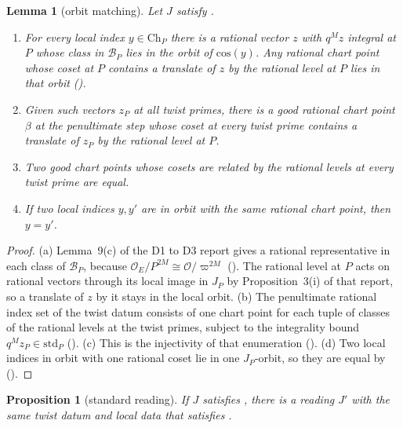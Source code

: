 \documentclass[11pt]{article}
\newcommand{\OEr}{\mathcal O_E}
\newcommand{\Ok}{\mathcal O}
\newcommand{\Bx}{\mathcal B}
\newtheorem{proposition}[theorem]{Proposition}
\newtheorem{lemma}[theorem]{Lemma}
\theoremstyle{remark}
\begin{document}
\begin{lemma}[orbit matching]\label{lem:orb}
Let $J$ satisfy .
\begin{enumerate}[label=(\alph*),itemsep=1pt]
\item For every local index $y\in\mathrm{Ch}_P$ there is a rational vector $z$ with $q^{M}z$ integral at $P$ whose class in $\Bx_P$ lies in the orbit of $\mathrm{cos}(y)$. Any rational chart point whose coset at $P$ contains a translate of $z$ by the rational level at $P$ lies in that orbit ().
\item Given such vectors $z_P$ at all twist primes, there is a good rational chart point $\beta$ at the penultimate step whose coset at every twist prime contains a translate of $z_P$ by the rational level at $P$.
\item Two good chart points whose cosets are related by the rational levels at every twist prime are equal.
\item If two local indices $y,y'$ are in orbit with the same rational chart point, then $y=y'$.
\end{enumerate}
\end{lemma}

\begin{proof}
(a) Lemma~9(c) of the D1 to D3 report gives a rational representative in each class of $\Bx_P$, because $\OEr/P^{2M}\cong\Ok/\varpi^{2M}$ (). The rational level at $P$ acts on rational vectors through its local image in $J_P$ by Proposition~3(i) of that report, so a translate of $z$ by it stays in the local orbit. (b) The penultimate rational index set of the twist datum consists of one chart point for each tuple of classes of the rational levels at the twist primes, subject to the integrality bound $q^{M}z_P\in\mathrm{std}_P$ (). (c) This is the injectivity of that enumeration (). (d) Two local indices in orbit with one rational coset lie in one $J_P$-orbit, so they are equal by  ().
\end{proof}

\begin{proposition}[standard reading]\label{prop:std}
If $J$ satisfies , there is a reading $J'$ with the same twist datum and local data that satisfies .
\end{proposition}
\end{document}
